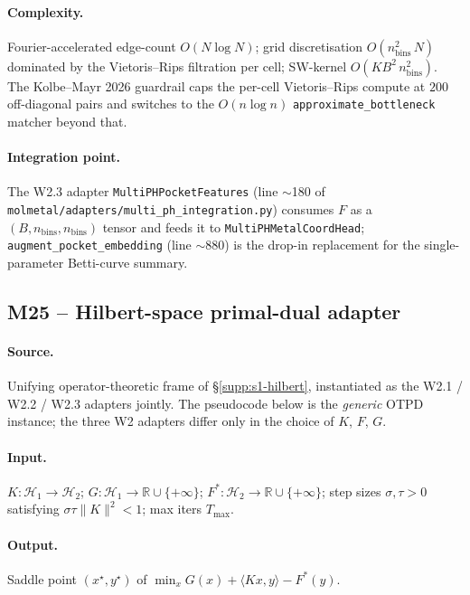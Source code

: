 \paragraph{Complexity.}
Fourier-accelerated edge-count $O(N \log N)$; grid discretisation
$O(n_{\mathrm{bins}}^{2}\, N)$ dominated by the Vietoris--Rips
filtration per cell; SW-kernel $O(K B^{2}\, n_{\mathrm{bins}}^{2})$.
The Kolbe--Mayr 2026 guardrail caps the per-cell Vietoris--Rips
compute at $200$ off-diagonal pairs and switches to the
$O(n \log n)$ \texttt{approximate\_bottleneck} matcher beyond that.

\paragraph{Integration point.}
The W2.3 adapter \texttt{MultiPHPocketFeatures} (line $\sim$180 of
\texttt{molmetal/adapters/multi\_ph\_integration.py}) consumes $F$
as a $(B, n_{\mathrm{bins}}, n_{\mathrm{bins}})$ tensor and feeds
it to \texttt{MultiPHMetalCoordHead}; \texttt{augment\_pocket\_embedding}
(line $\sim$880) is the drop-in replacement for the
single-parameter Betti-curve summary.

\subsection*{M25 -- Hilbert-space primal-dual adapter}
\label{supp:s2-m25}

\paragraph{Source.}
Unifying operator-theoretic frame of \S\ref{supp:s1-hilbert},
instantiated as the W2.1 / W2.2 / W2.3 adapters jointly.  The
pseudocode below is the \emph{generic} OTPD instance; the three
W2 adapters differ only in the choice of $K$, $F$, $G$.

\paragraph{Input.}
$K : \mathcal{H}_{1} \to \mathcal{H}_{2}$; $G : \mathcal{H}_{1} \to
\mathbb{R} \cup \{+\infty\}$; $F^{\ast} : \mathcal{H}_{2} \to
\mathbb{R} \cup \{+\infty\}$; step sizes $\sigma, \tau > 0$
satisfying $\sigma \tau \| K \|^{2} < 1$; max iters $T_{\max}$.

\paragraph{Output.}
Saddle point $(x^{\star}, y^{\star})$ of
$\min_{x} G(x) + \langle Kx, y \rangle - F^{\ast}(y)$.

